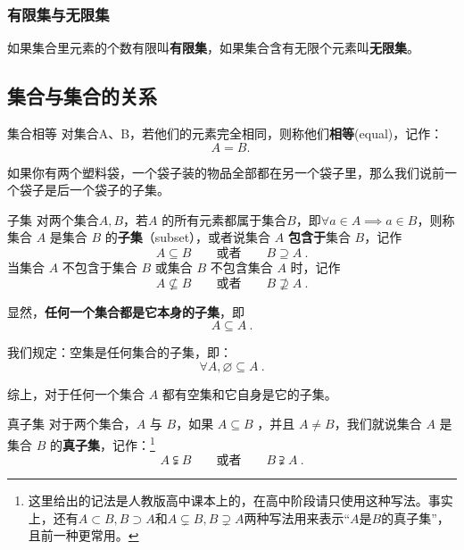 \subsubsection{有限集与无限集}

如果集合里元素的个数有限叫\textbf{有限集}，如果集合含有无限个元素叫\textbf{无限集}。

\subsection{集合与集合的关系}

\begin{definition}{集合相等}
对集合A、B，若他们的元素完全相同，则称他们\textbf{相等}(equal)，记作：
\begin{equation}
A=B.~
\end{equation}
\end{definition}

如果你有两个塑料袋，一个袋子装的物品全部都在另一个袋子里，那么我们说前一个袋子是后一个袋子的子集。

\begin{definition}{子集}
对两个集合$A,B$，若$A$ 的所有元素都属于集合$B$，即$\forall a\in A\implies a\in B$，则称集合 $A$ 是集合 $B$ 的\textbf{子集}（subset），或者说集合 $A$ \textbf{包含于}集合 $B$，记作
\begin{equation}
A \subseteq B\qquad\text{或者}\qquad B \supseteq A~.
\end{equation}
当集合 $A$ 不包含于集合 $B$ 或集合 $B$ 不包含集合 $A$ 时，记作
\begin{equation}
A \nsubseteq B\qquad\text{或者}\qquad B \nsupseteq A~.
\end{equation}
\end{definition}

显然，\textbf{任何一个集合都是它本身的子集}，即
\begin{equation}
A \subseteq A~.
\end{equation}

我们规定：空集是任何集合的子集，即：
\begin{equation}
\forall A,\varnothing \subseteq A~.
\end{equation}

综上，对于任何一个集合 $A$ 都有空集和它自身是它的子集。

\begin{definition}{真子集}
对于两个集合，$A$ 与 $B$，如果 $A\subseteq B$ ，并且 $A \ne B$，我们就说集合 $A$ 是集合 $B$ 的\textbf{真子集}，记作：\footnote{这里给出的记法是人教版高中课本上的，在高中阶段请只使用这种写法。事实上，还有$A\subset B,B\supset A$和$A\subsetneq B,B\supsetneq A$两种写法用来表示“$A$是$B$的真子集”，且前一种更常用。}
\begin{equation}
A \subsetneqq B\qquad\text{或者}\qquad B \supsetneqq A~.
\end{equation}
\end{definition}
